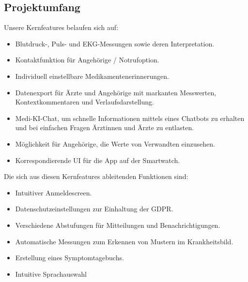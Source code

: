 \subsection{Projektumfang}
Unsere Kernfeatures belaufen sich auf:
\begin{itemize}
	\item Blutdruck-, Puls- und EKG-Messungen sowie deren Interpretation.
	\item Kontaktfunktion für Angehörige / Notrufoption.
	\item Individuell einstellbare Medikamentenerinnerungen.
	\item Datenexport für Ärzte und Angehörige mit markanten Messwerten, Kontextkommentaren und Verlaufsdarstellung.
	\item Medi-KI-Chat, um schnelle Informationen mittels eines Chatbots zu erhalten und bei einfachen Fragen Ärztinnen und Ärzte zu entlasten.
	\item Möglichkeit für Angehörige, die Werte von Verwandten einzusehen.
	\item Korrespondierende UI für die App auf der Smartwatch.
\end{itemize}

Die sich aus diesen Kernfeatures ableitenden Funktionen sind:
\begin{itemize}
	\item Intuitiver Anmeldescreen.
	\item Datenschutzeinstellungen zur Einhaltung der GDPR.
	\item Verschiedene Abstufungen für Mitteilungen und Benachrichtigungen.
	\item Automatische Messungen zum Erkennen von Mustern im Krankheitsbild.
	\item Erstellung eines Symptomtagebuchs.
	\item Intuitive Sprachauswahl
\end{itemize}

\newpage

